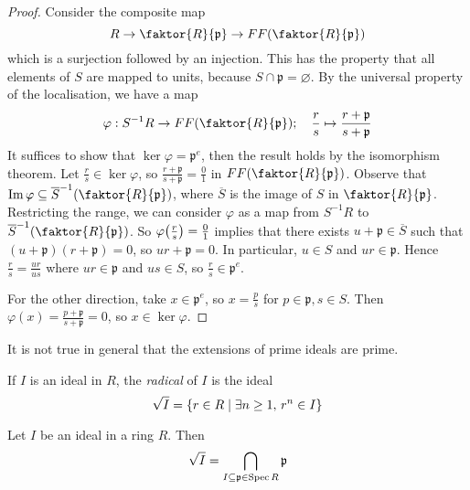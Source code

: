 \begin{proof}
    Consider the composite map
    \[ R \to \faktor{R}{\mathfrak p} \to FF\qty(\faktor{R}{\mathfrak p}) \]
    which is a surjection followed by an injection.
    This has the property that all elements of \( S \) are mapped to units, because \( S \cap \mathfrak p = \varnothing \).
    By the universal property of the localisation, we have a map
    \[ \varphi : S^{-1}R \to FF\qty(\faktor{R}{\mathfrak p});\quad \frac{r}{s} \mapsto \frac{r + \mathfrak p}{s + \mathfrak p} \]
    It suffices to show that \( \ker \varphi = \mathfrak p^e \), then the result holds by the isomorphism theorem.
    Let \( \frac{r}{s} \in \ker \varphi \), so \( \frac{r + \mathfrak p}{s + \mathfrak p} = \frac{0}{1} \) in \( FF\qty(\faktor{R}{\mathfrak p}) \).
    Observe that \( \Im \varphi \subseteq \overline S^{-1} \qty(\faktor{R}{\mathfrak p}) \), where \( \overline S \) is the image of \( S \) in \( \faktor{R}{\mathfrak p} \).
    Restricting the range, we can consider \( \varphi \) as a map from \( S^{-1}R \) to \( \overline S^{-1}\qty(\faktor{R}{\mathfrak p}) \).
    So \( \varphi\qty(\frac{r}{s}) = \frac{0}{1} \) implies that there exists \( u + \mathfrak p \in \overline S \) such that \( (u + \mathfrak p)(r + \mathfrak p) = 0 \), so \( ur + \mathfrak p = 0 \).
    In particular, \( u \in S \) and \( ur \in \mathfrak p \).
    Hence \( \frac{r}{s} = \frac{ur}{us} \) where \( ur \in \mathfrak p \) and \( us \in S \), so \( \frac{r}{s} \in \mathfrak p^e \).

    For the other direction, take \( x \in \mathfrak p^e \), so \( x = \frac{p}{s} \) for \( p \in \mathfrak p, s \in S \).
    Then \( \varphi(x) = \frac{p + \mathfrak p}{s + \mathfrak p} = 0 \), so \( x \in \ker \varphi \).
\end{proof}
It is not true in general that the extensions of prime ideals are prime.
\begin{definition}
    If \( I \) is an ideal in \( R \), the \emph{radical} of \( I \) is the ideal
    \[ \sqrt{I} = \qty{r \in R \mid \exists n \geq 1,\, r^n \in I} \]
\end{definition}
\begin{proposition}
    Let \( I \) be an ideal in a ring \( R \).
    Then
    \[ \sqrt{I} = \bigcap_{I \subseteq \mathfrak p \in \operatorname{Spec} R} \mathfrak p \]
\end{proposition}
